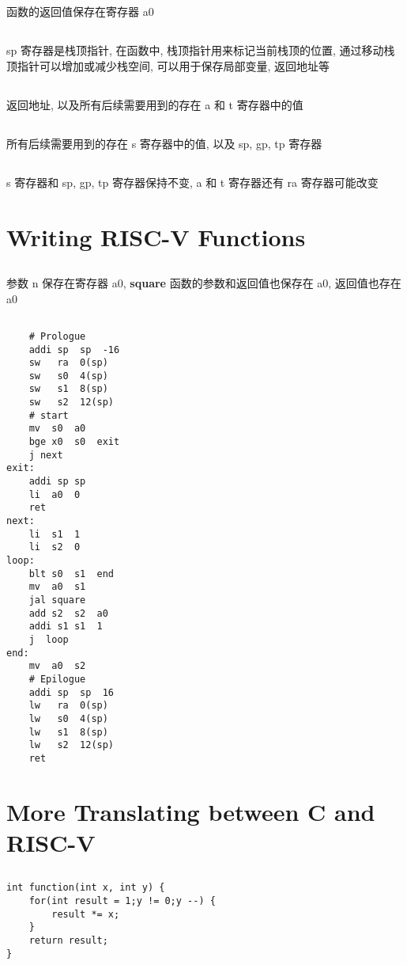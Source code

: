 \documentclass[UTF8,10pt,a4paper]{ctexart}
\begin{document}
\subsection{}
函数的返回值保存在寄存器 a0
\subsection{}
sp 寄存器是栈顶指针, 在函数中, 栈顶指针用来标记当前栈顶的位置, 通过移动栈顶指针可以增加或减少栈空间, 可以用于保存局部变量, 返回地址等
\subsection{}
返回地址, 以及所有后续需要用到的存在 a 和 t 寄存器中的值
\subsection{}
所有后续需要用到的存在 s 寄存器中的值, 以及 sp, gp, tp 寄存器
\subsection{}
s 寄存器和 sp, gp, tp 寄存器保持不变, a 和 t 寄存器还有 ra 寄存器可能改变
\section{Writing RISC-V Functions}
\subsection{}
参数 n 保存在寄存器 a0, \textbf{square} 函数的参数和返回值也保存在 a0, 返回值也存在 a0
\subsection{}
\begin{verbatim}
    # Prologue
    addi sp  sp  -16
    sw   ra  0(sp)
    sw   s0  4(sp)
    sw   s1  8(sp)
    sw   s2  12(sp)
    # start
    mv  s0  a0
    bge x0  s0  exit
    j next
exit:
    addi sp sp 
    li  a0  0
    ret
next:
    li  s1  1
    li  s2  0
loop:
    blt s0  s1  end
    mv  a0  s1
    jal square
    add s2  s2  a0
    addi s1 s1  1
    j  loop
end:
    mv  a0  s2
    # Epilogue
    addi sp  sp  16
    lw   ra  0(sp)
    lw   s0  4(sp)
    lw   s1  8(sp)
    lw   s2  12(sp)
    ret
\end{verbatim}
\section{More Translating between C and RISC-V}
\subsection{}
\begin{verbatim}
int function(int x, int y) {
    for(int result = 1;y != 0;y --) {
        result *= x;
    }
    return result;
}
\end{verbatim}
\end{document}
